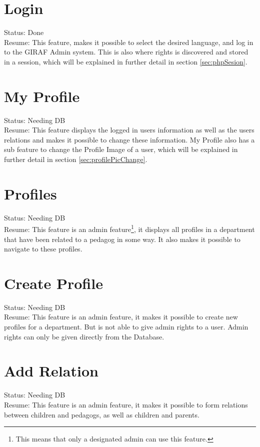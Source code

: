 \section{Login}
Status: Done\\
Resume: This feature, makes it possible to select the desired language, and log in to the GIRAF Admin system. This is also where rights is discovered and stored in a session, which will be explained in further detail in section \vref{sec:phpSesion}.

\section{My Profile}
Status: Needing DB\\
Resume: This feature displays the logged in users information as well as the users relations and makes it possible to change these information. My Profile also has a sub feature to change the Profile Image of a user, which will be explained in further detail in section \vref{sec:profilePicChange}.

\section{Profiles}
Status: Needing DB\\
Resume: This feature is an admin feature\footnote{This means that only a designated admin can use this feature.}, it displays all profiles in a department that have been related to a pedagog in some way. It also makes it possible to navigate to these profiles.

\section{Create Profile}
Status: Needing DB\\
Resume: This feature is an admin feature, it makes it possible to create new profiles for a department. But is not able to give admin rights to a user. Admin rights can only be given directly from the Database.

\section{Add Relation}
Status: Needing DB\\
Resume: This feature is an admin feature, it makes it possible to form relations between children and pedagogs, as well as children and parents.

